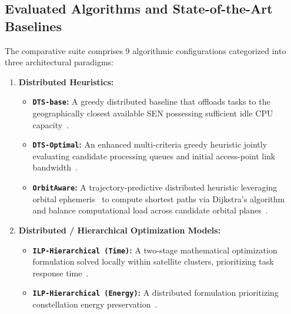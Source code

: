 \subsection{Evaluated Algorithms and State-of-the-Art Baselines}
\label{subsec:bench_algorithms}

The comparative suite comprises 9 algorithmic configurations categorized into three architectural paradigms:

\begin{enumerate}
    \item \textbf{Distributed Heuristics:}
    \begin{itemize}
        \item \textbf{\texttt{DTS-base}:} A greedy distributed baseline that offloads tasks to the geographically closest available SEN possessing sufficient idle CPU capacity~\cite{icdcs_satellite_2025}.
        \item \textbf{\texttt{DTS-Optimal}:} An enhanced multi-criteria greedy heuristic jointly evaluating candidate processing queues and initial access-point link bandwidth~\cite{icdcs_satellite_2025}.
        \item \textbf{\texttt{OrbitAware}:} A trajectory-predictive distributed heuristic leveraging orbital ephemeris~\cite{vallado2006sgp4} to compute shortest paths via Dijkstra's algorithm~\cite{dijkstra1959note} and balance computational load across candidate orbital planes~\cite{icdcs_satellite_2025}.
    \end{itemize}

    \item \textbf{Distributed / Hierarchical Optimization Models:}
    \begin{itemize}
        \item \textbf{\texttt{ILP-Hierarchical (Time)}:} A two-stage mathematical optimization formulation solved locally within satellite clusters, prioritizing task response time~\cite{icdcs_satellite_2025}.
        \item \textbf{\texttt{ILP-Hierarchical (Energy)}:} A distributed formulation prioritizing constellation energy preservation~\cite{icdcs_satellite_2025}.
    \end{itemize}


\end{enumerate}
